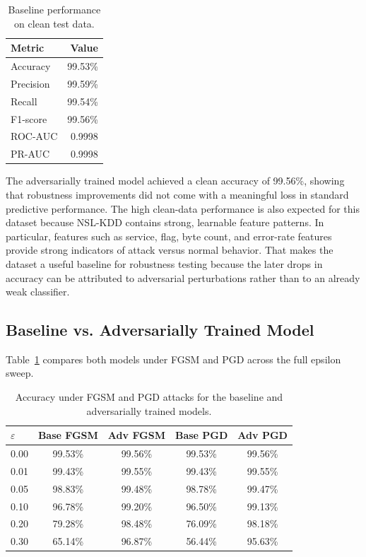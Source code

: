 \documentclass[11pt]{article}
\begin{document}
\begin{table}[htbp]
\centering
\begin{tabular}{lr}
\toprule
Metric & Value \\
\midrule
Accuracy & 99.53\% \\
Precision & 99.59\% \\
Recall & 99.54\% \\
F1-score & 99.56\% \\
ROC-AUC & 0.9998 \\
PR-AUC & 0.9998 \\
\bottomrule
\end{tabular}
\caption{Baseline performance on clean test data.}
\end{table}

The adversarially trained model achieved a clean accuracy of 99.56\%, showing that robustness improvements did not come with a meaningful loss in standard predictive performance.
The high clean-data performance is also expected for this dataset because NSL-KDD contains strong, learnable feature patterns. In particular, features such as service, flag, byte count, and error-rate features provide strong indicators of attack versus normal behavior. That makes the dataset a useful baseline for robustness testing because the later drops in accuracy can be attributed to adversarial perturbations rather than to an already weak classifier.

\subsection{Baseline vs. Adversarially Trained Model}

Table~\ref{tab:comparison} compares both models under FGSM and PGD across the full epsilon sweep.

\begin{table}[htbp]
\centering
\small
\begin{tabular}{lcccc}
\toprule
$\varepsilon$ & Base FGSM & Adv FGSM & Base PGD & Adv PGD \\
\midrule
0.00 & 99.53\% & 99.56\% & 99.53\% & 99.56\% \\
0.01 & 99.43\% & 99.55\% & 99.43\% & 99.55\% \\
0.05 & 98.83\% & 99.48\% & 98.78\% & 99.47\% \\
0.10 & 96.78\% & 99.20\% & 96.50\% & 99.13\% \\
0.20 & 79.28\% & 98.48\% & 76.09\% & 98.18\% \\
0.30 & 65.14\% & 96.87\% & 56.44\% & 95.63\% \\
\bottomrule
\end{tabular}
\caption{Accuracy under FGSM and PGD attacks for the baseline and adversarially trained models.}
\label{tab:comparison}
\end{table}
\end{document}
